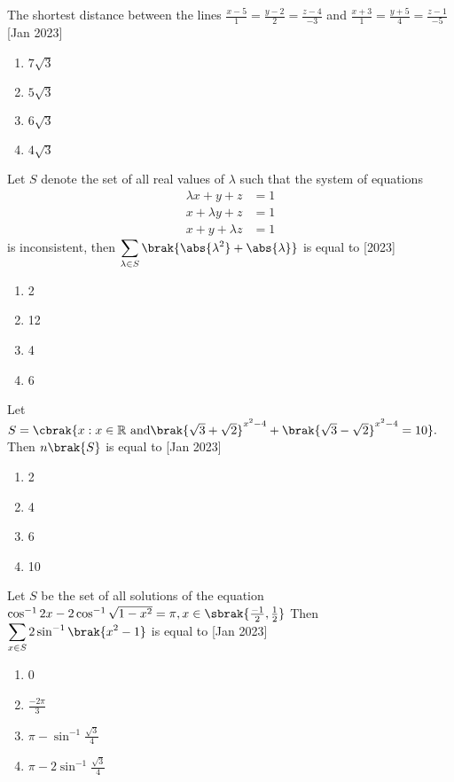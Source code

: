 \item The shortest distance between the lines $\frac{x-5}{1}=\frac{y-2}{2}=\frac{z-4}{-3}$ and $\frac{x+3}{1}=\frac{y+5}{4}=\frac{z-1}{-5}$
	\hfill{[Jan 2023]}
\begin{multicols}{2}
\begin{enumerate}
\item $7\sqrt{3}$
\item $5\sqrt{3}$
\item $6\sqrt{3}$
\item $4\sqrt{3}$
\end{enumerate}
\end{multicols}
\item Let $S$ denote the set of all real values of $\lambda$ such that the system of equations
\begin{align*}
    \lambda x+y+z&=1\\
    x+\lambda y+z&=1\\
    x+y+\lambda z&=1
\end{align*}
is inconsistent, then $\displaystyle \sum_{\lambda \in S}\brak{\abs{\lambda^2} + \abs{\lambda}}$ is equal to 
\hfill{[2023]}
\begin{enumerate}
\item 2
\item 12
\item 4
\item 6
\end{enumerate}
\item Let $S=\cbrak{ x:x \in \mathbb{R}  \text{ and}  \brak{\sqrt{3}+\sqrt{2}}^{x^2-4}+\brak{ \sqrt{3}-\sqrt{2}}^{x^2-4}=10}.$ Then $n\brak{S}$ is equal to 
	\hfill{[Jan 2023]}
\begin{multicols}{2}
\begin{enumerate}
\item 2
\item 4
\item 6
\item 10
\end{enumerate}
\end{multicols}
\item Let $S$ be the set of all solutions of the equation $\cos^{-1}{2x} -2 \cos^{-1}{\sqrt{1-x^2}}=\pi,  x \in \sbrak{\frac{-1}{2},\frac{1}{2}} $ Then $\displaystyle \sum_{x\in S} 2 \sin^{-1}\brak{x^2-1}$ is equal to
	\hfill{[Jan 2023]}
\begin{multicols}{2}
\begin{enumerate}
\item 0
\item $\frac{-2\pi}{3}$
\item $\pi-\sin^{-1}\frac{\sqrt 3}{4}$
\item $\pi-2\sin^{-1}\frac{\sqrt 3}{4}$
\end{enumerate}
\end{multicols}
